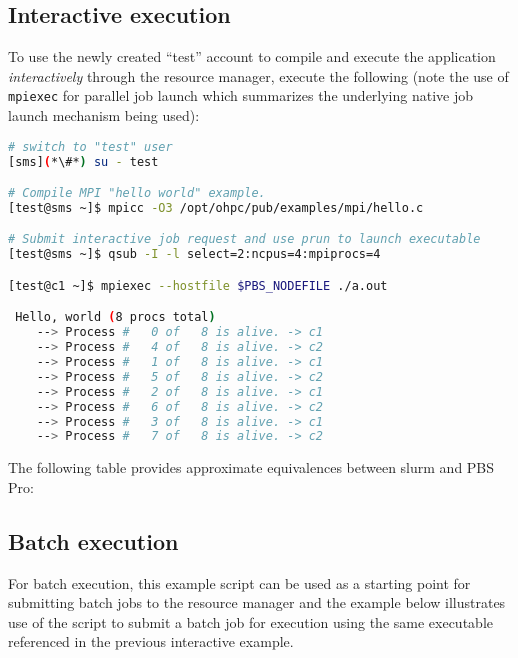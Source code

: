 \subsection{Interactive execution}
To use the newly created ``test'' account to compile and execute the
application {\em interactively} through the resource manager, execute the
following (note the use of \texttt{mpiexec} for parallel job launch which summarizes
the underlying native job launch mechanism being used):

\begin{lstlisting}[language=bash,keywords={}]
# switch to "test" user
[sms](*\#*) su - test

# Compile MPI "hello world" example. 
[test@sms ~]$ mpicc -O3 /opt/ohpc/pub/examples/mpi/hello.c

# Submit interactive job request and use prun to launch executable
[test@sms ~]$ qsub -I -l select=2:ncpus=4:mpiprocs=4

[test@c1 ~]$ mpiexec --hostfile $PBS_NODEFILE ./a.out

 Hello, world (8 procs total)
    --> Process #   0 of   8 is alive. -> c1
    --> Process #   4 of   8 is alive. -> c2
    --> Process #   1 of   8 is alive. -> c1
    --> Process #   5 of   8 is alive. -> c2
    --> Process #   2 of   8 is alive. -> c1
    --> Process #   6 of   8 is alive. -> c2
    --> Process #   3 of   8 is alive. -> c1
    --> Process #   7 of   8 is alive. -> c2
\end{lstlisting}


\begin{center}
\begin{tcolorbox}[]
The following table provides approximate equivalences between slurm and PBS
Pro:

\vspace*{0.15cm}

\end{tcolorbox}
\end{center}

\subsection{Batch execution}

For batch execution, this example script can be used as a starting point for 
submitting batch jobs to the resource manager and the example below illustrates
use of the script to submit a batch job for execution using the same executable 
referenced in the previous interactive example.

